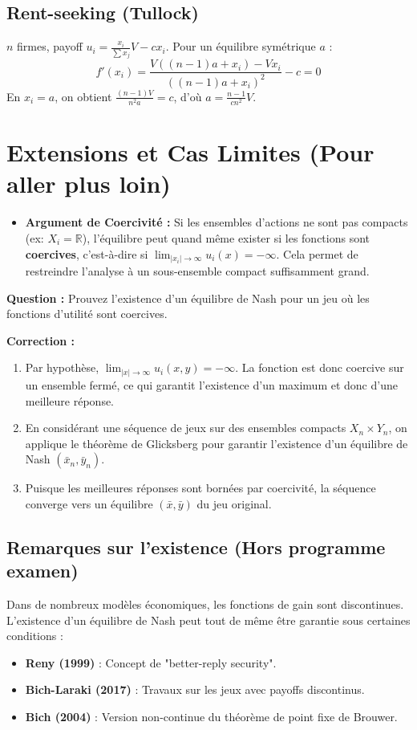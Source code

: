 \subsection{Rent-seeking (Tullock)}
$n$ firmes, payoff $u_i = \frac{x_i}{\sum x_j}V - cx_i$. Pour un équilibre symétrique $a$ :
$$f'(x_i) = \frac{V((n-1)a + x_i) - Vx_i}{((n-1)a + x_i)^2} - c = 0$$
En $x_i = a$, on obtient $\frac{(n-1)V}{n^2 a} = c$, d'où $a = \frac{n-1}{cn^2}V$.

\section{Extensions et Cas Limites (Pour aller plus loin)}

\begin{itemize}
    \item \textbf{Argument de Coercivité :} Si les ensembles d'actions ne sont pas compacts (ex: $X_i = \mathbb{R}$), l'équilibre peut quand même exister si les fonctions sont \textbf{coercives}, c'est-à-dire si $\lim_{|x_i| \to \infty} u_i(x) = -\infty$. Cela permet de restreindre l'analyse à un sous-ensemble compact suffisamment grand.
\end{itemize}

\begin{exemple}
\textbf{Question :}
Prouvez l'existence d'un équilibre de Nash pour un jeu où les fonctions d'utilité sont coercives.

\textbf{Correction :}
\begin{enumerate}
    \item Par hypothèse, $\lim_{|x| \to \infty} u_i(x, y) = -\infty$. La fonction est donc coercive sur un ensemble fermé, ce qui garantit l'existence d'un maximum et donc d'une meilleure réponse.
    \item En considérant une séquence de jeux sur des ensembles compacts $X_n \times Y_n$, on applique le théorème de Glicksberg pour garantir l'existence d'un équilibre de Nash $(\bar{x}_n, \bar{y}_n)$.
    \item Puisque les meilleures réponses sont bornées par coercivité, la séquence converge vers un équilibre $(\bar{x}, \bar{y})$ du jeu original.
\end{enumerate}
\end{exemple}

\subsection{Remarques sur l'existence (Hors programme examen)}
Dans de nombreux modèles économiques, les fonctions de gain sont discontinues. L'existence d'un équilibre de Nash peut tout de même être garantie sous certaines conditions :
\begin{itemize}
    \item \textbf{Reny (1999)} : Concept de "better-reply security".
    \item \textbf{Bich-Laraki (2017)} : Travaux sur les jeux avec payoffs discontinus.
    \item \textbf{Bich (2004)} : Version non-continue du théorème de point fixe de Brouwer.
\end{itemize}

